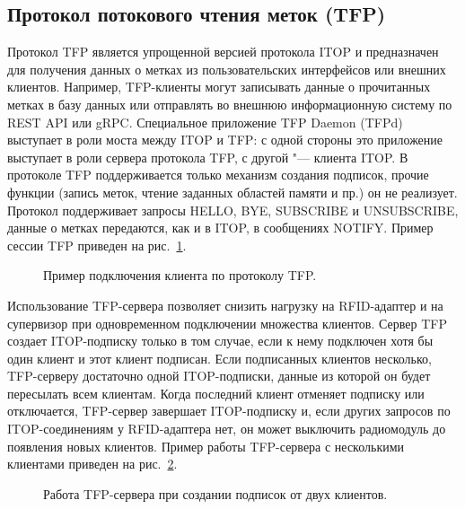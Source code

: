 \subsection{Протокол потокового чтения меток (TFP)}\label{sec:ch5_tfp}

Протокол TFP является упрощенной версией протокола ITOP и предназначен для получения данных о метках из пользовательских интерфейсов или внешних клиентов. Например, TFP-клиенты могут записывать данные о прочитанных метках в базу данных или отправлять во внешнюю информационную систему по REST API или gRPC. Специальное приложение TFP Daemon (TFPd) выступает в роли моста между ITOP и TFP: с одной стороны это приложение выступает в роли сервера протокола TFP, с другой "--- клиента ITOP. В протоколе TFP поддерживается только механизм создания подписок, прочие функции (запись меток, чтение заданных областей памяти и пр.) он не реализует. Протокол поддерживает запросы HELLO, BYE, SUBSCRIBE и UNSUBSCRIBE, данные о метках передаются, как и в ITOP, в сообщениях NOTIFY. Пример сессии TFP приведен на рис.~\ref{fig:ch5_tfp_session_1}.

\begin{figure}[ht]
  \caption{Пример подключения клиента по протоколу TFP.}
  \label{fig:ch5_tfp_session_1}
\end{figure}

Использование TFP-сервера позволяет снизить нагрузку на RFID-адаптер и на супервизор при одновременном подключении множества клиентов. Сервер TFP создает ITOP-подписку только в том случае, если к нему подключен хотя бы один клиент и этот клиент подписан. Если подписанных клиентов несколько, TFP-серверу достаточно одной ITOP-подписки, данные из которой он будет пересылать всем клиентам. Когда последний клиент отменяет подписку или отключается, TFP-сервер завершает ITOP-подписку и, если других запросов по ITOP-соединениям у RFID-адаптера нет, он может выключить радиомодуль до появления новых клиентов. Пример работы TFP-сервера с несколькими клиентами приведен на рис.~\ref{fig:ch5_tfp_session_2}.

\begin{figure}[ht]
  \caption{Работа TFP-сервера при создании подписок от двух клиентов.}
  \label{fig:ch5_tfp_session_2}
\end{figure}



